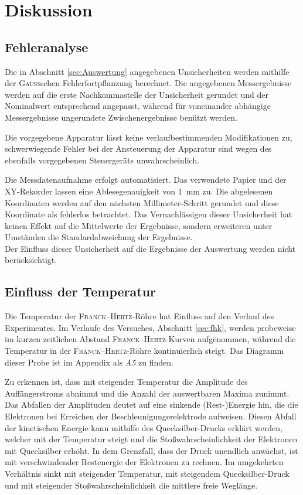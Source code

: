 
\section{Diskussion}
\label{sec:Diskussion}
\subsection{Fehleranalyse}
Die in Abschnitt \ref{sec:Auswertung} angegebenen Unsicherheiten werden mithilfe der \textsc{Gauss}schen Fehlerfortpflanzung berechnet.
Die angegebenen Messergebnisse werden auf die erste Nachkommastelle der Unsicherheit gerundet und der Nominalwert entsprechend angepasst, 
während für voneinander abhängige Messergebnisse ungerundete Zwischenergebnisse benützt werden.

Die vorgegebene Apparatur lässt keine verlaufbestimmenden Modifikationen zu, schwerwiegende Fehler bei der Ansteuerung der Apparatur sind wegen des ebenfalls vorgegebenen Steuergeräts unwahrscheinlich.

Die Messdatenaufnahme erfolgt automatisiert.
Das verwendete Papier und der XY-Rekorder lassen eine Ablesegenauigkeit von \SI{1}{\milli\meter} zu.
Die abgelesenen Koordinaten werden auf den nächsten Millimeter-Schritt gerundet und diese Koordinate als fehlerlos betrachtet.
Das Vernachlässigen dieser Unsicherheit hat keinen Effekt auf die Mittelwerte der Ergebnisse, sondern erweiteren unter Umständen die Standardabweichung der Ergebnisse.\\
Der Einfluss dieser Unsicherheit auf die Ergebnisse der Auswertung werden nicht berücksichtigt.

\subsection{Einfluss der Temperatur}
\label{sec:disk_temp}
Die Temperatur der \textsc{Franck}--\textsc{Hertz}-Röhre hat Einfluss auf den Verlauf des Experimentes.
Im Verlaufe des Versuches, Abschnitt \ref{sec:fhk}, werden probeweise im kurzen zeitlichen Abstand \textsc{Franck}--\textsc{Hertz}-Kurven aufgenommen, während die Temperatur in der \textsc{Franck}--\textsc{Hertz}-Röhre kontinuierlich steigt.
Das Diagramm dieser Probe ist im Appendix als \emph{A5} zu finden.

Zu erkennen ist, dass mit steigender Temperatur die Amplitude des Auffängerstroms %
abnimmt und die Anzahl der auswertbaren Maxima zunimmt.
Das Abfallen der Amplituden deutet auf eine sinkende (Rest-)Energie hin, die die Elektronen bei Erreichen der Beschleunigungerelektrode aufweisen.
Diesen Abfall der kinetischen Energie kann mithilfe des Quecksilber-Drucks erklärt werden, welcher mit der Temperatur steigt und die Stoßwahrscheinlichkeit der Elektronen mit Quecksilber erhöht.
In dem Grenzfall, dass der Druck unendlich anwächst, ist mit verschwindender Restenergie der Elektronen zu rechnen.
Im umgekehrten Verhältnis sinkt mit steigender Temperatur, mit steigendem Quecksilber-Druck und mit steigender Stoßwahrscheinlichkeit die mittlere freie Weglänge.

